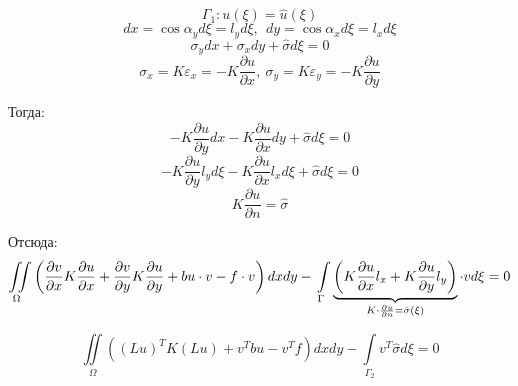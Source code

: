 \documentclass{bmstu}
\begin{document}
	\[\Gamma_1: u(\xi) = \hat u(\xi)\]
	\[dx = \cos \alpha_y d\xi = l_y d\xi,\ \ dy = \cos \alpha_x d\xi = l_x d\xi\]
	\[\sigma_y dx + \sigma_x dy + \hat \sigma d\xi = 0\]
	\[\sigma_x = K \varepsilon_x = -K \frac{\partial u}{\partial x},\ \sigma_y = K \varepsilon_y = -K \frac{\partial u}{\partial y}\]
	
	Тогда:
	\[-K \frac{\partial u}{\partial y} dx -K \frac{\partial u}{\partial x} dy + \hat \sigma d\xi = 0\]
	\[-K \frac{\partial u}{\partial y} l_y d\xi -K \frac{\partial u}{\partial x} l_x d\xi + \hat \sigma d\xi = 0\]
	\[K \frac{\partial u}{\partial n} = \hat \sigma\]
	
	Отсюда:
	\begin{equation}\label{2d_eq_2}
	\iint \limits_{\Omega} \left(\frac{\partial v}{\partial x} K \frac{\partial u}{\partial x} + \frac{\partial v}{\partial y} K \frac{\partial u}{\partial y} + bu \cdot v - f \cdot v\right) dx dy - \\
	\int \limits_{\Gamma} \underbrace{ \left(K \frac{\partial u}{\partial x} l_x + K \frac{\partial u}{\partial y} l_y\right)}_{K \cdot \frac{\partial u}{\partial n} = \hat \sigma(\xi)}  \cdot v d\xi = 0 
	\end{equation}
	
	\[\iint \limits_{\Omega} ((Lu)^T K (Lu) + v^T bu - v^T f) dxdy - \int \limits_{\Gamma_2} v^T \hat \sigma d\xi = 0\]
	
	   
\end{document}

